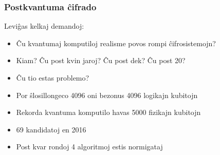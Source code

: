 \documentclass[utf8, aspectratio=169]{beamer}
\begin{document}
\begin{frame}
  \frametitle{Postkvantuma ĉifrado}
  Leviĝas kelkaj demandoj:
  \begin{itemize}
  \item<+-> Ĉu kvantumaj komputiloj realisme povos rompi ĉifrosistemojn?
  \item<+-> Kiam? Ĉu post kvin jaroj? Ĉu post dek? Ĉu post 20?
  \item<+-> Ĉu tio estas problemo?
  \item<+-> Por ŝlosillongeco 4096 oni bezonus 4096 logikajn kubitojn
  \item<+-> Rekorda kvantuma komputilo havas 5000 fizikajn kubitojn
  \end{itemize}

  \vspace{1em}

  \begin{itemize}
  \item<+-> 69 kandidatoj en 2016
  \item<+-> Post kvar rondoj 4 algoritmoj estis normigataj
  \end{itemize}

\end{frame}
\end{document}
